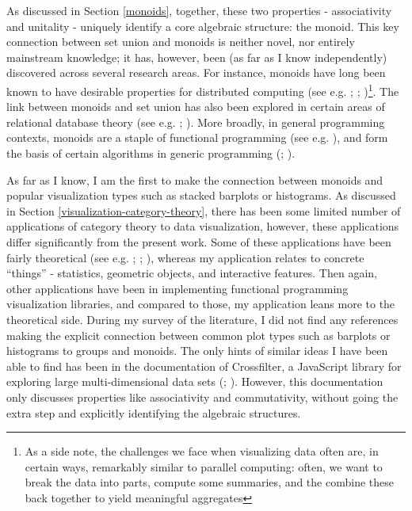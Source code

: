 \documentclass[
  openany]{book}
\theoremstyle{definition}
\theoremstyle{definition}
\theoremstyle{definition}
\theoremstyle{definition}
\theoremstyle{remark}
\begin{document}
As discussed in Section \ref{monoids}, together, these two properties - associativity and unitality - uniquely identify a core algebraic structure: the monoid. This key connection between set union and monoids is neither novel, nor entirely mainstream knowledge; it has, however, been (as far as I know independently) discovered across several research areas. For instance, monoids have long been known to have desirable properties for distributed computing (see e.g. ; ; )\footnote{As a side note, the challenges we face when visualizing data often are, in certain ways, remarkably similar to parallel computing: often, we want to break the data into parts, compute some summaries, and the combine these back together to yield meaningful aggregates}. The link between monoids and set union has also been explored in certain areas of relational database theory (see e.g. ; ). More broadly, in general programming contexts, monoids are a staple of functional programming (see e.g. ), and form the basis of certain algorithms in generic programming (; ).

As far as I know, I am the first to make the connection between monoids and popular visualization types such as stacked barplots or histograms. As discussed in Section \ref{visualization-category-theory}, there has been some limited number of applications of category theory to data visualization, however, these applications differ significantly from the present work. Some of these applications have been fairly theoretical (see e.g. ; ; ), whereas my application relates to concrete ``things'' - statistics, geometric objects, and interactive features. Then again, other applications have been in implementing functional programming visualization libraries, and compared to those, my application leans more to the theoretical side. During my survey of the literature, I did not find any references making the explicit connection between common plot types such as barplots or histograms to groups and monoids. The only hints of similar ideas I have been able to find has been in the documentation of Crossfilter, a JavaScript library for exploring large multi-dimensional data sets (; ). However, this documentation only discusses properties like associativity and commutativity, without going the extra step and explicitly identifying the algebraic structures.
\end{document}
